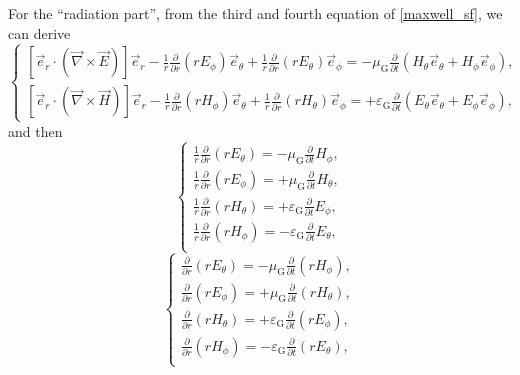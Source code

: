 \documentclass{article}
\def\p{\partial}
\begin{document}
For the ``radiation part'', from the third and fourth equation of \eqref{maxwell_sf}, we can derive
\begin{equation}
    \begin{cases}
        [\vec{e}_r\cdot(\vec{\nabla}\times\vec{E})]\vec{e}_r-\frac{1}{r}\frac{\p}{\p r}(r{E}_\phi)\vec{e}_\theta+\frac{1}{r}\frac{\p}{\p r}(r{E}_\theta)\vec{e}_\phi=-\mu_{\text{G}}\frac{\p}{\p t}({H}_\theta\vec{e}_\theta+{H}_\phi\vec{e}_\phi),\\
        [\vec{e}_r\cdot(\vec{\nabla}\times\vec{H})]\vec{e}_r-\frac{1}{r}\frac{\p}{\p r}(r{H}_\phi)\vec{e}_\theta+\frac{1}{r}\frac{\p}{\p r}(r{H}_\theta)\vec{e}_\phi=+\varepsilon_{\text{G}}\frac{\p}{\p t}({E}_\theta\vec{e}_\theta+{E}_\phi\vec{e}_\phi),
    \end{cases}
\end{equation}
and then
\begin{equation}
    \begin{cases}
        \frac{1}{r}\frac{\p}{\p r}(r{E}_\theta)
        =-\mu_{\text{G}}\frac{\p}{\p t}{H}_\phi,\\
        \frac{1}{r}\frac{\p}{\p r}(r{E}_\phi)
        =+\mu_{\text{G}}\frac{\p}{\p t}{H}_\theta,\\
        \frac{1}{r}\frac{\p}{\p r}(r{H}_\theta)
        =+\varepsilon_{\text{G}}\frac{\p}{\p t}{E}_\phi,\\
        \frac{1}{r}\frac{\p}{\p r}(r{H}_\phi)
        =-\varepsilon_{\text{G}}\frac{\p}{\p t}{E}_\theta,\\
    \end{cases}
\end{equation}
\begin{equation}
    \begin{cases}
        \frac{\p}{\p r}(r{E}_\theta)
        =-\mu_{\text{G}}\frac{\p}{\p t}(r{H}_\phi),\\
        \frac{\p}{\p r}(r{E}_\phi)
        =+\mu_{\text{G}}\frac{\p}{\p t}(r{H}_\theta),\\
        \frac{\p}{\p r}(r{H}_\theta)
        =+\varepsilon_{\text{G}}\frac{\p}{\p t}(r{E}_\phi),\\
        \frac{\p}{\p r}(r{H}_\phi)
        =-\varepsilon_{\text{G}}\frac{\p}{\p t}(r{E}_\theta),\\
    \end{cases}
\end{equation}
\end{document}
